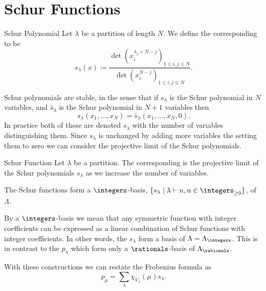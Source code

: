 \documentclass[fleqn]{NotesClass}
\newcommand{\partition}{\vdash}
\begin{document}
    \section{Schur Functions}
    \begin{dfn}{Schur Polynomial}{}
        Let \(\lambda\) be a partition of length \(N\).
        We define the corresponding  to be
        \begin{equation}
            s_\lambda(x) \coloneq \frac{\det(x_i^{\lambda_j + N - j})_{1 \le i, j \le N}}{\det(x_i^{N-j})_{1\le i,j\le N}}.
        \end{equation}
    \end{dfn}
    
    Schur polynomials are stable, in the sense that if \(s_\lambda\) is the Schur polynomial in \(N\) variables, and \(\hat{s}_\lambda\) is the Schur polynomial in \(N + 1\) variables then
    \begin{equation}
        s_\lambda(x_1, \dotsc, x_N) = \hat{s}_\lambda(x_1, \dotsc, x_N, 0).
    \end{equation}
    In practice both of these are denoted \(s_\lambda\) with the number of variables distinguishing them.
    Since \(s_\lambda\) is unchanged by adding more variables the setting them to zero we can consider the projective limit of the Schur polynomials.
    
    \begin{dfn}{Schur Function}{}
        Let \(\lambda\) be a partition.
        The corresponding  is the projective limit of the Schur polynomials \(s_\lambda\) as we increase the number of variables.
    \end{dfn}
    
    \begin{thm}{}{}
        The Schur functions form a \(\integers\)-basis, \(\{s_\lambda \mid \lambda \partition n, n \in \integers_{\ge 0}\}\), of \(\Lambda\).
    \end{thm}
    
    By a \(\integers\)-basis we mean that any symmetric function with integer coefficients can be expressed as a linear combination of Schur functions with integer coefficients.
    In other words, the \(s_\lambda\) form a basis of \(\Lambda = \Lambda_{\integers}\).
    This is in contrast to the \(p_\lambda\) which form only a \(\rationals\)-basis of \(\Lambda_{\rationals}\).
    
    With these constructions we can restate the Frobenius formula as
    \begin{equation}
        p_\mu = \sum_\lambda \chi_{V_\lambda}(\mu) s_\lambda.
    \end{equation}
    
\end{document}
